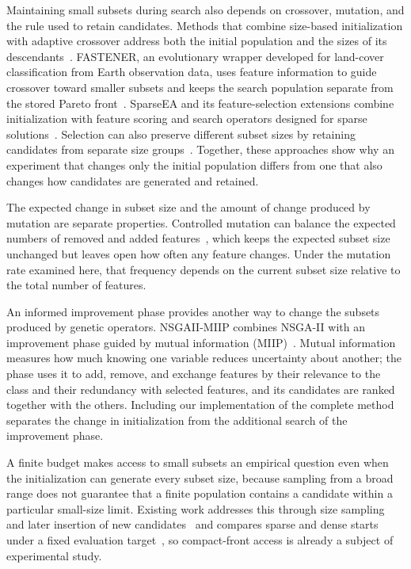 Maintaining small subsets during search also depends on crossover, mutation, and the rule used to retain candidates. Methods that combine size-based initialization with adaptive crossover address both the initial population and the sizes of its descendants~\cite{Xue2022,Wang2026}. FASTENER, an evolutionary wrapper developed for land-cover classification from Earth observation data, uses feature information to guide crossover toward smaller subsets and keeps the search population separate from the stored Pareto front~\cite{Koprivec2020}. SparseEA and its feature-selection extensions combine initialization with feature scoring and search operators designed for sparse solutions~\cite{Tian2020SparseEA,Chu2024}. Selection can also preserve different subset sizes by retaining candidates from separate size groups~\cite{Li2026CORAL}. Together, these approaches show why an experiment that changes only the initial population differs from one that also changes how candidates are generated and retained.

The expected change in subset size and the amount of change produced by mutation are separate properties. Controlled mutation can balance the expected numbers of removed and added features~\cite{Oh2004,Li2025}, which keeps the expected subset size unchanged but leaves open how often any feature changes. Under the mutation rate examined here, that frequency depends on the current subset size relative to the total number of features.

An informed improvement phase provides another way to change the subsets produced by genetic operators. NSGAII-MIIP combines NSGA-II with an improvement phase guided by mutual information (MIIP)~\cite{Li2025}. Mutual information measures how much knowing one variable reduces uncertainty about another; the phase uses it to add, remove, and exchange features by their relevance to the class and their redundancy with selected features, and its candidates are ranked together with the others. Including our implementation of the complete method separates the change in initialization from the additional search of the improvement phase.

A finite budget makes access to small subsets an empirical question even when the initialization can generate every subset size, because sampling from a broad range does not guarantee that a finite population contains a candidate within a particular small-size limit. Existing work addresses this through size sampling and later insertion of new candidates~\cite{Miyandoab2024} and compares sparse and dense starts under a fixed evaluation target~\cite{Cong2026}, so compact-front access is already a subject of experimental study.


